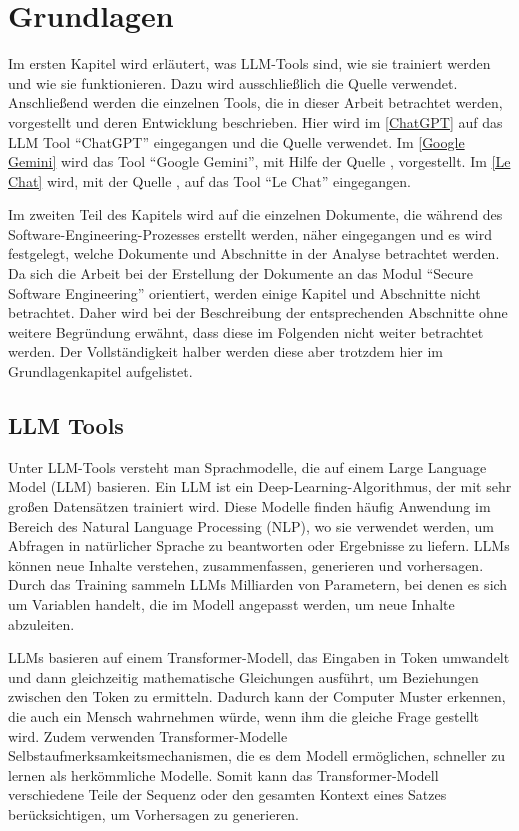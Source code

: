
\chapter{Grundlagen} 

Im ersten Kapitel wird erläutert, was LLM-Tools sind, wie sie trainiert werden und wie sie funktionieren. Dazu wird 
ausschließlich die Quelle \cite{GrundlagenLLM} verwendet.
Anschließend werden die einzelnen Tools, die in dieser Arbeit betrachtet werden, vorgestellt und deren 
Entwicklung beschrieben. Hier wird im \autoref{ChatGPT} auf das LLM Tool ``ChatGPT'' eingegangen und die 
Quelle \cite{GrundlagenChatGPT} verwendet. Im \autoref{Google Gemini} wird das Tool ``Google Gemini'', mit Hilfe 
der Quelle \cite{GrundlagenGemini}, vorgestellt. Im \autoref{Le Chat} wird, mit der Quelle \cite{GrundlagenLeChat}, 
auf das Tool ``Le Chat'' eingegangen. 

Im zweiten Teil des Kapitels wird auf die einzelnen Dokumente, die während des Software-Engineering-Prozesses 
erstellt werden, näher eingegangen und es wird festgelegt, welche Dokumente und Abschnitte in der Analyse betrachtet 
werden. Da sich die Arbeit bei der Erstellung der Dokumente an das Modul ``Secure Software Engineering'' orientiert, 
werden einige Kapitel und Abschnitte nicht betrachtet. Daher wird bei der Beschreibung der entsprechenden Abschnitte ohne 
weitere Begründung erwähnt, dass diese im Folgenden nicht weiter betrachtet werden. Der Vollständigkeit halber werden 
diese aber trotzdem hier im Grundlagenkapitel aufgelistet.

\section{LLM Tools}  \label{LLM Tools}

Unter LLM-Tools versteht man Sprachmodelle, die auf einem Large Language Model (LLM) basieren. Ein LLM ist ein 
Deep-Learning-Algorithmus, der mit sehr großen Datensätzen trainiert wird. Diese Modelle finden häufig Anwendung 
im Bereich des Natural Language Processing (NLP), wo sie verwendet werden, um Abfragen in natürlicher Sprache zu 
beantworten oder Ergebnisse zu liefern. LLMs können neue Inhalte verstehen, zusammenfassen, generieren und vorhersagen. 
Durch das Training sammeln LLMs Milliarden von Parametern, bei denen es sich um Variablen handelt, die im Modell angepasst 
werden, um neue Inhalte abzuleiten.

LLMs basieren auf einem Transformer-Modell, das Eingaben in Token umwandelt und dann gleichzeitig mathematische 
Gleichungen ausführt, um Beziehungen zwischen den Token zu ermitteln. Dadurch kann der Computer Muster erkennen, 
die auch ein Mensch wahrnehmen würde, wenn ihm die gleiche Frage gestellt wird. Zudem verwenden Transformer-Modelle 
Selbstaufmerksamkeitsmechanismen, die es dem Modell ermöglichen, schneller zu lernen als herkömmliche Modelle. Somit 
kann das Transformer-Modell verschiedene Teile der Sequenz oder den gesamten Kontext eines Satzes berücksichtigen, um 
Vorhersagen zu generieren.

